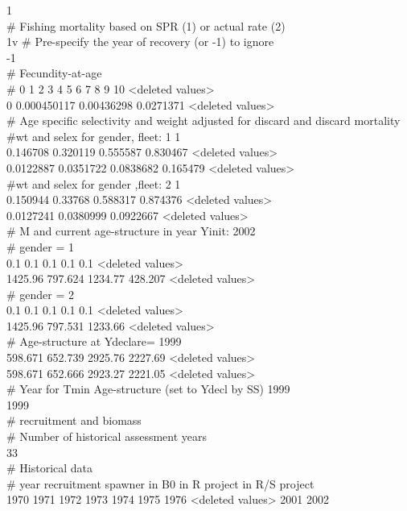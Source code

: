 1\\
\# Fishing mortality based on SPR (1) or actual rate (2)\\
1v
\# Pre-specify the year of recovery (or -1) to ignore\\
-1\\
\# Fecundity-at-age\\
\# 0 1 2 3 4 5 6 7 8 9 10 <deleted values> \\
0 0.000450117 0.00436298 0.0271371 <deleted values> \\
\# Age specific selectivity and weight adjusted for discard and discard mortality\\
\#wt and selex for gender, fleet: 1 1\\
0.146708 0.320119 0.555587 0.830467 <deleted values> \\
0.0122887 0.0351722 0.0838682 0.165479 <deleted values> \\
\#wt and selex for gender ,fleet: 2 1\\
0.150944 0.33768 0.588317 0.874376 <deleted values>\\
0.0127241 0.0380999 0.0922667 <deleted values>\\
\# M and current age-structure in year Yinit: 2002\\
\# gender = 1\\
0.1 0.1 0.1 0.1 0.1 <deleted values>\\
1425.96 797.624 1234.77 428.207 <deleted values>\\
\# gender = 2\\
0.1 0.1 0.1 0.1 0.1 <deleted values>\\
1425.96 797.531 1233.66 <deleted values> \\
\# Age-structure at Ydeclare= 1999\\
598.671 652.739 2925.76 2227.69 <deleted values>\\
598.671 652.666 2923.27 2221.05 <deleted values>\\
\# Year for Tmin Age-structure (set to Ydecl by SS) 1999\\
1999\\
\#  recruitment and biomass\\
\# Number of historical assessment years\\
33\\
\# Historical data\\
\# year recruitment spawner in B0 in R project in R/S project\\
1970 1971 1972 1973 1974 1975 1976 <deleted values> 2001 2002 \\
